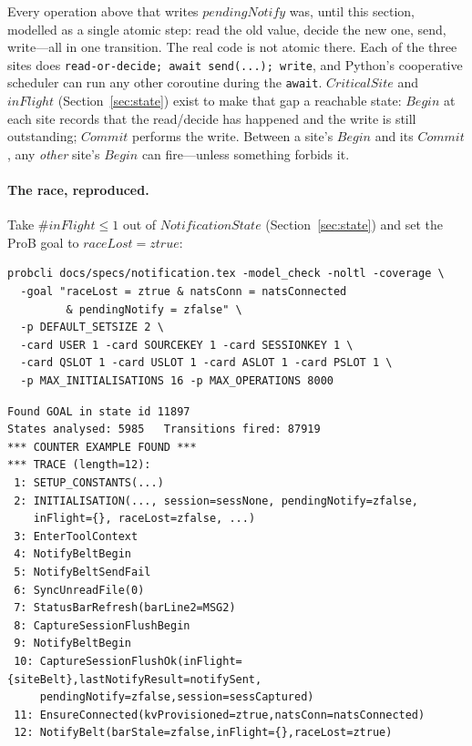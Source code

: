 \documentclass[a4paper,10pt,fleqn]{article}
\begin{document}
Every operation above that writes $pendingNotify$ was, until this
section, modelled as a single atomic step: read the old value, decide
the new one, send, write---all in one transition.  The real code is not
atomic there.  Each of the three sites does
\texttt{read-or-decide; await send(...); write}, and Python's
cooperative scheduler can run any other coroutine during the
\texttt{await}.  $CriticalSite$ and $inFlight$ (Section~\ref{sec:state})
exist to make that gap a reachable state: $Begin$ at each site records
that the read/decide has happened and the write is still outstanding;
$Commit$ performs the write.  Between a site's $Begin$ and its $Commit$,
any \emph{other} site's $Begin$ can fire---unless something forbids it.

\paragraph{The race, reproduced.}  Take $\# inFlight \leq 1$ out of
$NotificationState$ (Section~\ref{sec:state}) and set the ProB goal to
$raceLost = ztrue$:

\begin{verbatim}
probcli docs/specs/notification.tex -model_check -noltl -coverage \
  -goal "raceLost = ztrue & natsConn = natsConnected
         & pendingNotify = zfalse" \
  -p DEFAULT_SETSIZE 2 \
  -card USER 1 -card SOURCEKEY 1 -card SESSIONKEY 1 \
  -card QSLOT 1 -card USLOT 1 -card ASLOT 1 -card PSLOT 1 \
  -p MAX_INITIALISATIONS 16 -p MAX_OPERATIONS 8000
\end{verbatim}

\begin{verbatim}
Found GOAL in state id 11897
States analysed: 5985   Transitions fired: 87919
*** COUNTER EXAMPLE FOUND ***
*** TRACE (length=12):
 1: SETUP_CONSTANTS(...)
 2: INITIALISATION(..., session=sessNone, pendingNotify=zfalse,
    inFlight={}, raceLost=zfalse, ...)
 3: EnterToolContext
 4: NotifyBeltBegin
 5: NotifyBeltSendFail
 6: SyncUnreadFile(0)
 7: StatusBarRefresh(barLine2=MSG2)
 8: CaptureSessionFlushBegin
 9: NotifyBeltBegin
 10: CaptureSessionFlushOk(inFlight={siteBelt},lastNotifyResult=notifySent,
     pendingNotify=zfalse,session=sessCaptured)
 11: EnsureConnected(kvProvisioned=ztrue,natsConn=natsConnected)
 12: NotifyBelt(barStale=zfalse,inFlight={},raceLost=ztrue)
\end{verbatim}
\end{document}

